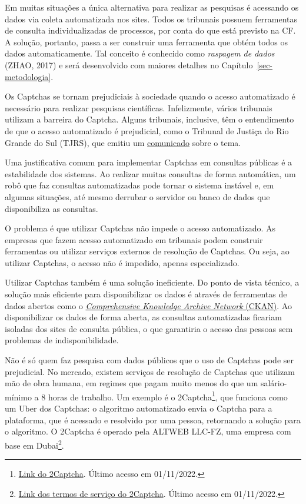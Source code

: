 \documentclass[12pt,twoside,brazilian]{book}
\begin{document}
Em muitas situações a única alternativa para realizar as pesquisas é
acessando os dados via coleta automatizada nos sites. Todos os tribunais
possuem ferramentas de consulta individualizadas de processos, por conta
do que está previsto na CF. A solução, portanto, passa a ser construir
uma ferramenta que obtém todos os dados automaticamente. Tal conceito é
conhecido como \emph{raspagem de dados} (ZHAO, 2017) e será desenvolvido
com maiores detalhes no Capítulo~\ref{sec-metodologia}.

Os Captchas se tornam prejudiciais à sociedade quando o acesso
automatizado é necessário para realizar pesquisas científicas.
Infelizmente, vários tribunais utilizam a barreira do Captcha. Alguns
tribunais, inclusive, têm o entendimento de que o acesso automatizado é
prejudicial, como o Tribunal de Justiça do Rio Grande do Sul (TJRS), que
emitiu um
\href{https://www.tjrs.jus.br/novo/processos-e-servicos/processo-eletronico/acesso-robotizado-a-dados-publicos-e-duplamente-arriscado/}{comunicado}
sobre o tema.

Uma justificativa comum para implementar Captchas em consultas públicas
é a estabilidade dos sistemas. Ao realizar muitas consultas de forma
automática, um robô que faz consultas automatizadas pode tornar o
sistema instável e, em algumas situações, até mesmo derrubar o servidor
ou banco de dados que disponibiliza as consultas.

O problema é que utilizar Captchas não impede o acesso automatizado. As
empresas que fazem acesso automatizado em tribunais podem construir
ferramentas ou utilizar serviços externos de resolução de Captchas. Ou
seja, ao utilizar Captchas, o acesso não é impedido, apenas
especializado.

Utilizar Captchas também é uma solução ineficiente. Do ponto de vista
técnico, a solução mais eficiente para disponibilizar os dados é através
de ferramentas de dados abertos como o
\href{https://ckan.org/}{\emph{Comprehensive Knowledge Archive Network}
(CKAN)}. Ao disponibilizar os dados de forma aberta, as consultas
automatizadas ficariam isoladas dos sites de consulta pública, o que
garantiria o acesso das pessoas sem problemas de indisponibilidade.

Não é só quem faz pesquisa com dados públicos que o uso de Captchas pode
ser prejudicial. No mercado, existem serviços de resolução de Captchas
que utilizam mão de obra humana, em regimes que pagam muito menos do que
um salário-mínimo a 8 horas de trabalho. Um exemplo é o
2Captcha\footnote{\href{https://2captcha.com/make-money-online}{Link do
  2Captcha}. Último acesso em 01/11/2022.}, que funciona como um Uber
dos Captchas: o algoritmo automatizado envia o Captcha para a
plataforma, que é acessado e resolvido por uma pessoa, retornando a
solução para o algoritmo. O 2Captcha é operado pela ALTWEB LLC-FZ, uma
empresa com base em Dubai\footnote{\href{https://2captcha.com/terms-of-service}{Link
  dos termos de serviço do 2Captcha}. Último acesso em 01/11/2022.}.
\end{document}
